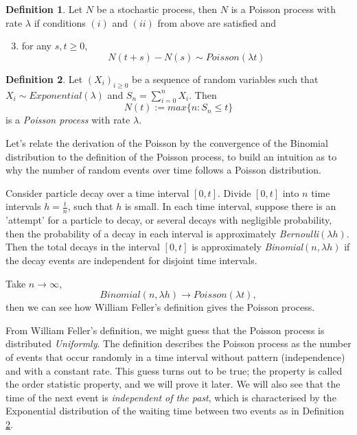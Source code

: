 \documentclass[11pt, oneside]{article}   	%
\theoremstyle{definition}
\newtheorem{definition}{Definition}[section]
\theoremstyle{remark}
\begin{document}
\begin{definition} Let $N$ be a stochastic process, then $N$ is a Poisson process with rate $\lambda$ if conditions $(i)$ and $(ii)$ from above are satisfied and
  \begin{enumerate}[label=(\roman*)]
    \setcounter{enumi}{2}
    \item for any $s,t\geq0$, $$N(t+s)-N(s) \sim \textit{Poisson}(\lambda t)$$
  \end{enumerate}
\end{definition}

\begin{definition} \label{def3}
  Let $(X_i)_{i\geq0}$ be a sequence of random variables such that \\$X_i\sim \textit{Exponential}(\lambda)$ and $S_n=\sum_{i=0}^n{X_i}$. Then $$N(t):=max\{n:S_n\leq t\}$$ is a \textit{Poisson process} with rate $\lambda$.
\end{definition}

Let's relate the derivation of the Poisson by the convergence of the Binomial distribution to the definition of the Poisson process, to build an intuition as to why the number of random events over time follows a Poisson distribution. 

Consider particle decay over a time interval $[0,t]$. Divide $[0,t]$ into $n$ time intervals $h=\frac{t}{n}$, such that $h$ is small. In each time interval, suppose there is an 'attempt' for a particle to decay, or several decays with negligible probability, then the probability of a decay in each interval is approximately \textit{Bernoulli}$(\lambda h)$. Then the total decays in the interval $[0,t]$ is approximately \textit{Binomial}$(n, \lambda h)$ if the decay events are independent for disjoint time intervals.


Take $n \to \infty$, 
$$\textit{Binomial}\left(n, \lambda h\right) \to \textit{Poisson}(\lambda t),$$
then we can see how William Feller's definition gives the Poisson process.

\vspace{5mm}

From William Feller's definition, we might guess that the Poisson process is distributed \textit{Uniformly}. The definition describes the Poisson process as the number of events that occur randomly in a time interval without pattern (independence) and with a constant rate. This guess turns out to be true; the property is called the order statistic property, and we will prove it later.
We will also see that the time of the next event is \textit{independent of the past}, which is characterised by the Exponential distribution of the waiting time between two events as in Definition \ref{def3}.
\end{document}
